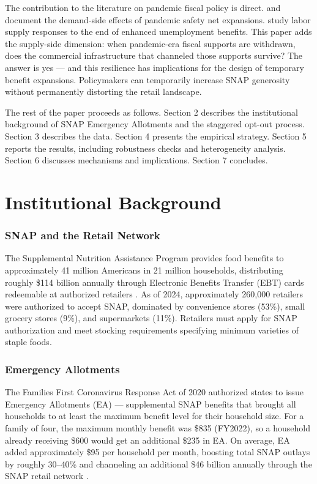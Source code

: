 \documentclass[12pt]{article}
\begin{document}
The contribution to the literature on pandemic fiscal policy is direct. \citet{bitler2020transfers} and \citet{schanzenbach2023snap} document the demand-side effects of pandemic safety net expansions. \citet{east2023pandemic} study labor supply responses to the end of enhanced unemployment benefits. This paper adds the supply-side dimension: when pandemic-era fiscal supports are withdrawn, does the commercial infrastructure that channeled those supports survive? The answer is yes --- and this resilience has implications for the design of temporary benefit expansions. Policymakers can temporarily increase SNAP generosity without permanently distorting the retail landscape.

The rest of the paper proceeds as follows. Section 2 describes the institutional background of SNAP Emergency Allotments and the staggered opt-out process. Section 3 describes the data. Section 4 presents the empirical strategy. Section 5 reports the results, including robustness checks and heterogeneity analysis. Section 6 discusses mechanisms and implications. Section 7 concludes.

\section{Institutional Background}

\subsubsection*{SNAP and the Retail Network} The Supplemental Nutrition Assistance Program provides food benefits to approximately 41 million Americans in 21 million households, distributing roughly \$114 billion annually through Electronic Benefits Transfer (EBT) cards redeemable at authorized retailers \citep{usda2023snap}. As of 2024, approximately 260,000 retailers were authorized to accept SNAP, dominated by convenience stores (53\%), small grocery stores (9\%), and supermarkets (11\%). Retailers must apply for SNAP authorization and meet stocking requirements specifying minimum varieties of staple foods.

\subsubsection*{Emergency Allotments} The Families First Coronavirus Response Act of 2020 authorized states to issue Emergency Allotments (EA) --- supplemental SNAP benefits that brought all households to at least the maximum benefit level for their household size. For a family of four, the maximum monthly benefit was \$835 (FY2022), so a household already receiving \$600 would get an additional \$235 in EA. On average, EA added approximately \$95 per household per month, boosting total SNAP outlays by roughly 30--40\% and channeling an additional \$46 billion annually through the SNAP retail network \citep{bitler2023snap}.
\end{document}
